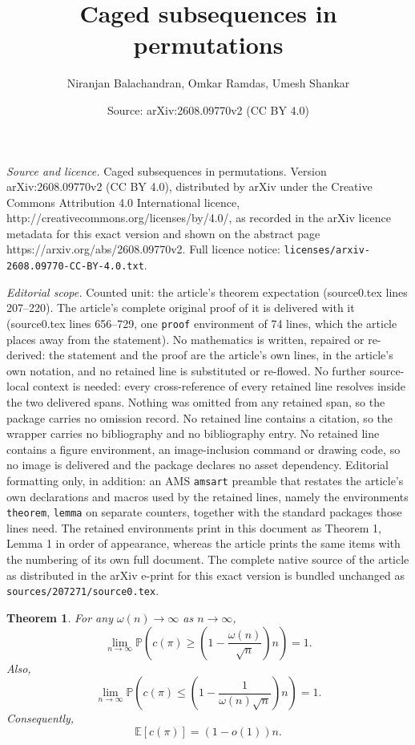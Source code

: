 \documentclass[10pt,a4paper]{amsart}
\title{Caged subsequences in permutations}
\author{Niranjan Balachandran, Omkar Ramdas, Umesh Shankar}
\date{Source: arXiv:2608.09770v2 (CC BY 4.0)}
\newtheorem{theorem}{Theorem}
\begin{document}
\maketitle

\noindent\emph{Source and licence.} Caged subsequences in permutations. Version arXiv:2608.09770v2 (CC BY 4.0), distributed by arXiv under the Creative Commons Attribution 4.0 International licence, http://creativecommons.org/licenses/by/4.0/, as recorded in the arXiv licence metadata for this exact version and shown on the abstract page https://arxiv.org/abs/2608.09770v2. Full licence notice: \texttt{licenses/arxiv-2608.09770-CC-BY-4.0.txt}.\par\smallskip

\noindent\textit{Editorial scope.} Counted unit: the article's theorem expectation (source0.tex lines 207--220). The article's complete original proof of it is delivered with it (source0.tex lines 656--729, one \texttt{proof} environment of 74 lines, which the article places away from the statement). No mathematics is written, repaired or re-derived: the statement and the proof are the article's own lines, in the article's own notation, and no retained line is substituted or re-flowed.  No further source-local context is needed: every cross-reference of every retained line resolves inside the two delivered spans.  Nothing was omitted from any retained span, so the package carries no omission record.  No retained line contains a citation, so the wrapper carries no bibliography and no bibliography entry.  No retained line contains a figure environment, an image-inclusion command or drawing code, so no image is delivered and the package declares no asset dependency.  Editorial formatting only, in addition: an AMS \texttt{amsart} preamble that restates the article's own declarations and macros used by the retained lines, namely the environments \texttt{theorem}, \texttt{lemma} on separate counters, together with the standard packages those lines need.  The retained environments print in this document as Theorem 1, Lemma 1 in order of appearance, whereas the article prints the same items with the numbering of its own full document.  The complete native source of the article as distributed in the arXiv e-print for this exact version is bundled unchanged as \texttt{sources/207271/source0.tex}.
\begin{theorem}\label{expectation}
For any $\omega(n) \rightarrow \infty$ as $n \rightarrow \infty$,
\[
  \lim_{n \rightarrow \infty} \mathbb{P}\left( c(\pi) \geq \left(1-\frac{\omega(n)}{\sqrt{n}}\right)n \right) = 1.
\]
Also, 
\[
  \lim_{n \rightarrow \infty} \mathbb{P}\left( c(\pi) \leq \left(1-\frac{1}{\omega(n)\sqrt{n}}\right)n \right) = 1.
\]
Consequently, 
\[
\mathbb{E}[c(\pi)] = (1 - o(1))n .
\]
\end{theorem}
\end{document}
